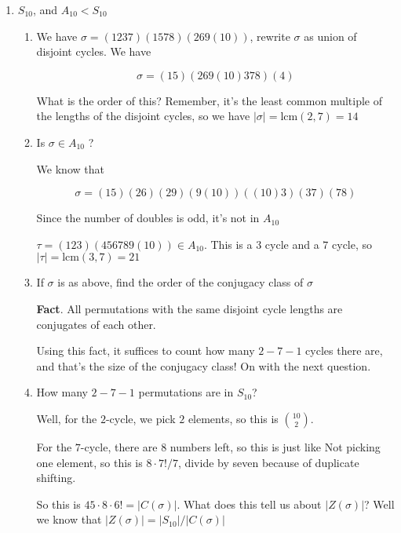 \documentclass[12pt]{article}
\def\lcm{\text{lcm}}
\theoremstyle{remark}
\theoremstyle{remark}
\theoremstyle{remark}
\theoremstyle{remark}
\theoremstyle{remark}
\begin{document}
\begin{enumerate}
  \item $S_{10}$, and $A_{10} < S_{10}$

    \begin{enumerate}
      \item We have $\sigma = (1237)(1578)(269(10))$, rewrite $\sigma$ as union of
        disjoint cycles. We have

        \[
          \sigma = (15)(269(10)378)(4)
        \]

        What is the order of this? Remember, it's the least common multiple of the
        lengths of the disjoint cycles, so we have $|\sigma| = \lcm(2, 7) = 14$
      \item Is $\sigma \in A_{10}$ ?

        We know that 

        \[
          \sigma = (15)(26)(29)(9(10))((10)3)(37)(78)
        \]

        Since the number of doubles is odd, it's not in $A_{10}$

        $\tau = (123)(456789(10)) \in A_{10}$. This is a $3$ cycle and a $7$ cycle, so
        $|\tau| = \lcm(3, 7) = 21$

      \item If $\sigma$ is as above, find the order of the conjugacy class of
        $\sigma$

        {\bf Fact}. All permutations with the same disjoint cycle lengths are
        conjugates of each other.

        Using this fact, it suffices to count how many $2-7-1$ cycles there are,
        and that's the size of the conjugacy class! On with the next question.

      \item How many $2-7-1$ permutations are in $S_{10}$?

        Well, for the $2$-cycle, we pick $2$ elements, so this is
        $\binom{10}{2}$.

        For the $7$-cycle, there are $8$ numbers left, so this is just like
        Not picking one element, so this is $8 \cdot 7! / 7$, divide by seven
        because of duplicate shifting.

        So this is $45 \cdot 8 \cdot6! = |C(\sigma)|$. What does this tell us about
        $|Z(\sigma)|$? Well we know that $|Z(\sigma)| = |S_{10}| / |C(\sigma)|$
    \end{enumerate}
\end{enumerate}
\end{document}
